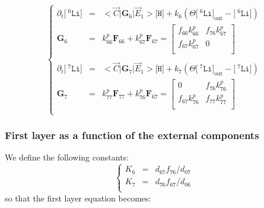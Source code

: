 \documentclass[aps,onecolumn,11pt]{revtex4}
\newcommand{\mychem}[1]{\mathtt{#1}}
\newcommand{\myconc}[1]{\big[#1\big]}
\newcommand{\spLi}[1]{{\!~^{#1}\mychem{Li}}}
\newcommand{\Li}[1]{\myconc{\spLi{#1}}}
\newcommand{\spproton}{\mychem{H}}
\newcommand{\proton}{\myconc{\spproton}}
\newcommand{\myout}[1]{{#1}_{\mathrm{out}}}
\newcommand{\LiOut}[1]{\myout{\Li{#1}}}
\newcommand{\mymat}[1]{{\bm{#1}}}
\begin{document}
\begin{equation}
\left\lbrace
\begin{array}{rcl}
	\partial_t \Li{6} & = & <\vec{C}|\mymat{G}_6|\vec{E}_1> \proton+ k_6\left(\Theta \LiOut{6} - \Li{6}\right)\\
	\mymat{G}_6 &= & k^p_{66} \mymat{F}_{66} + k^p_{67}\mymat{F}_{67} = 
	\begin{bmatrix}
	f_{66}k^p_{66} & f_{76} k^p_{67} \\
	f_{67}k^p_{67} & 0 \\
	\end{bmatrix}
	\\
	\\
	\partial_t \Li{7} & = & <\vec{C}|\mymat{G}_7|\vec{E}_1> \proton + k_7\left(\Theta \LiOut{7} - \Li{7}\right)\\
	\mymat{G}_7 & = & k^p_{77} \mymat{F}_{77} + k^p_{76}\mymat{F}_{67} = 
	\begin{bmatrix}
	0              & f_{76} k^p_{76}\\
	f_{67}k^p_{76} & f_{77}k^p_{77}\\
	\end{bmatrix}
	\\
\end{array}
\right.
\end{equation}


\subsubsection{First layer as a function of the external components}
We define the following constants:
\begin{equation}
\left\lbrace
\begin{array}{rcl}
K_6 & = & d_{67} f_{76}/d_{07} \\
K_7 & = &  d_{76} f_{67}/d_{06}\\
\end{array}
\right.
\end{equation}
so that the first layer equation becomes:
	
\end{document}
